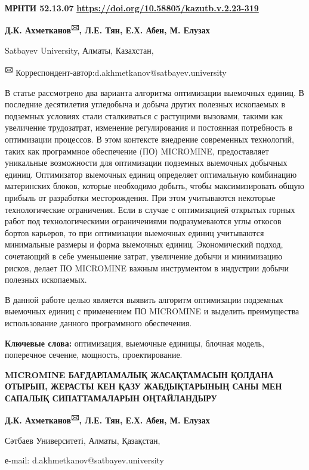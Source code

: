 \newpage
{\bfseries МРНТИ 52.13.07}
\hfill {\bfseries \href{https://doi.org/10.58805/kazutb.v.2.23-319}{https://doi.org/10.58805/kazutb.v.2.23-319}}


\begin{center}
{\bfseries Д.К. Ахметканов\textsuperscript{🖂}, Л.Е. Тян, Е.Х. Абен, М. Елузах}

Satbayev University, Алматы, Казахстан,

{\bfseries \textsuperscript{🖂}}
Корреспондент-автор:d.akhmetkanov@satbayev.university
\end{center}

В статье рассмотрено два варианта алгоритма оптимизации выемочных
единиц. В последние десятилетия угледобыча и добыча других полезных
ископаемых в подземных условиях стали сталкиваться с растущими вызовами,
такими как увеличение трудозатрат, изменение регулирования и постоянная
потребность в оптимизации процессов. В этом контексте внедрение
современных технологий, таких как программное обеспечение (ПО)
MICROMINE, предоставляет уникальные возможности для оптимизации
подземных выемочных добычных единиц. Оптимизатор выемочных единиц
определяет оптимальную комбинацию материнских блоков, которые необходимо
добыть, чтобы максимизировать общую прибыль от разработки месторождения.
При этом учитываются некоторые технологические ограничения. Если в
случае с оптимизацией открытых горных работ под технологическими
ограничениями подразумеваются углы откосов бортов карьеров, то при
оптимизации выемочных единиц учитываются минимальные размеры и форма
выемочных единиц. Экономический подход, сочетающий в себе уменьшение
затрат, увеличение добычи и минимизацию рисков, делает ПО MICROMINE
важным инструментом в индустрии добычи полезных ископаемых.

В данной работе целью является выявить алгоритм оптимизации подземных
выемочных единиц с применением ПО MICROMINE и выделить преимущества
использование данного программного обеспечения.

{\bfseries Ключевые слова:} оптимизация, выемочные единицы, блочная модель,
поперечное сечение, мощность, проектирование.

\begin{center}
{\large\bfseries MICROMINE БАҒДАРЛАМАЛЫҚ ЖАСАҚТАМАСЫН ҚОЛДАНА ОТЫРЫП, ЖЕРАСТЫ КЕН
ҚАЗУ ЖАБДЫҚТАРЫНЫҢ САНЫ МЕН САПАЛЫҚ СИПАТТАМАЛАРЫН ОҢТАЙЛАНДЫРУ}

{\bfseries Д.К. Ахметканов\textsuperscript{🖂}, Л.Е. Тян, Е.Х. Абен, М.
Елузах}

Сәтбаев Университеті, Алматы, Қазақстан,

е-mail: d.akhmetkanov@satbayev.university
\end{center}

